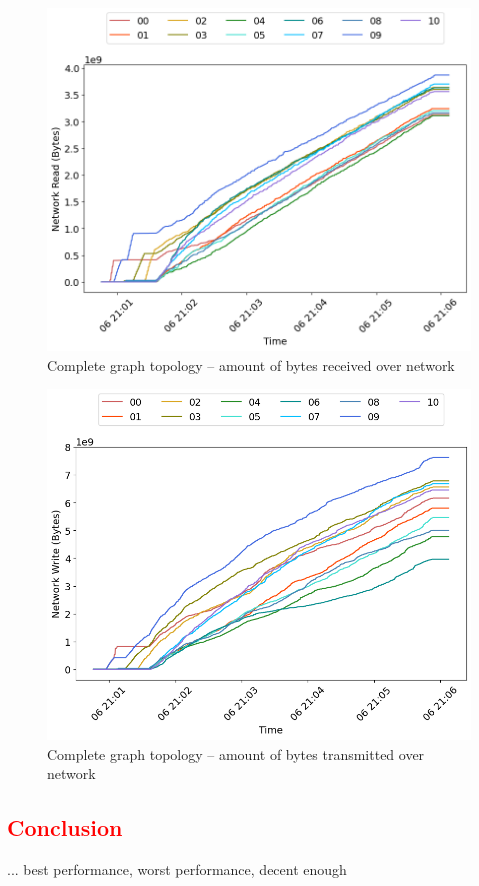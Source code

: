\begin{minipage}{0.5\linewidth}
\begin{figure}[H]
\captionsetup{justification=centering,width=0.8\linewidth}
\includegraphics[width=\linewidth]{figures/graph-complete/net_read.png}
\caption{Complete graph topology -- amount of bytes received over network}
\label{fig:graph-complete-cpu_usage}
\end{figure}
\end{minipage}
\begin{minipage}{0.5\linewidth}
\begin{figure}[H]
\captionsetup{justification=centering,width=0.8\linewidth}
\includegraphics[width=\linewidth]{figures/graph-complete/net_write.png}
\caption{Complete graph topology -- amount of bytes transmitted over network}
\label{fig:graph-complete-mem_usage}
\end{figure}
\end{minipage}


\subsection{\textcolor{red}{Conclusion}}
...
best performance, worst performance, decent enough



